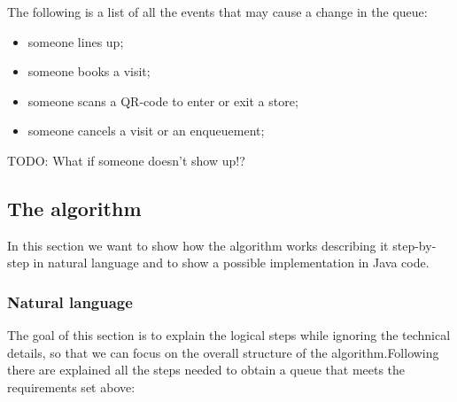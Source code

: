 \noindent
The following is a list of all the events that may cause a change in the queue:
\begin{itemize}[topsep=0pt]
    \item someone lines up;
    \item someone books a visit;
    \item someone scans a QR-code to enter or exit a store;
    \item someone cancels a visit or an enqueuement;
\end{itemize}

TODO: What if someone doesn't show up!?

\subsection{The algorithm}
\label{subsubsect:implementation}

In this section we want to show how the algorithm works describing it step-by-step in natural language and to show a possible implementation in Java code.

\subsubsection{Natural language}
\label{subsubsect:naturallanguage}

The goal of this section is to explain the logical steps while ignoring the technical details, so that we can focus on the overall structure of the algorithm.\newline Following there are explained all the steps needed to obtain a queue that meets the requirements set above:

